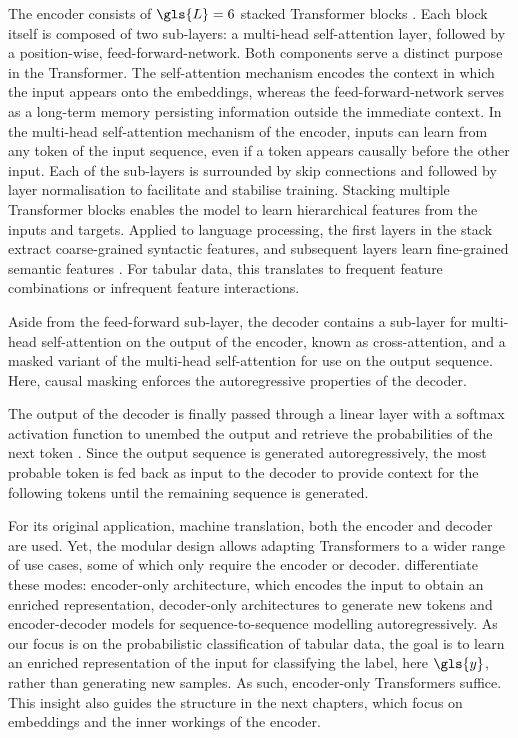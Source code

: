 The encoder consists of $\gls{L}=6$ stacked Transformer blocks \autocite[][6]{vaswaniAttentionAllYou2017}. Each block itself is composed of two sub-layers: a multi-head self-attention layer, followed by a position-wise, \gls{feed-forward-network}. Both components serve a distinct purpose in the Transformer. The self-attention mechanism encodes the context in which the input appears onto the \glspl{embedding}, whereas the \gls{feed-forward-network} serves as a long-term memory persisting information outside the immediate context. In the multi-head self-attention mechanism of the encoder, inputs can learn from any \gls{token} of the input sequence, even if a \gls{token} appears causally before the other input. Each of the sub-layers is surrounded by skip connections \autocite[][2]{heDeepResidualLearning2015} and followed by layer normalisation \autocite[][4]{baLayerNormalization2016} to facilitate and stabilise training. Stacking multiple Transformer blocks enables the model to learn hierarchical features from the inputs and targets. Applied to language processing, the first layers in the stack extract coarse-grained syntactic features, and subsequent layers learn fine-grained semantic features \autocites[][3651]{jawaharWhatDoesBERT2019}[][4596]{tenneyBERTRediscoversClassical2019}. For tabular data, this translates to frequent feature combinations or infrequent feature interactions.

Aside from the feed-forward sub-layer, the decoder contains a sub-layer for multi-head self-attention on the output of the encoder, known as cross-attention, and a masked variant of the multi-head self-attention for use on the output sequence. Here, causal masking enforces the autoregressive properties of the decoder.

The output of the decoder is finally passed through a linear layer with a softmax activation function to unembed the output and retrieve the probabilities of the next \gls{token} \autocite[][5]{vaswaniAttentionAllYou2017}. Since the output sequence is generated autoregressively, the most probable \gls{token} is fed back as input to the decoder to provide context for the following \glspl{token} until the remaining sequence is generated.

For its original application, machine translation, both the encoder and decoder are used. Yet, the modular design allows adapting Transformers to a wider range of use cases, some of which only require the encoder or decoder. \textcite[][16--17]{raffelExploringLimitsTransfer2020} differentiate these modes: encoder-only architecture, which encodes the input to obtain an enriched representation, decoder-only architectures to generate new \glspl{token} and encoder-decoder models for sequence-to-sequence modelling autoregressively. As our focus is on the probabilistic classification of tabular data, the goal is to learn an enriched representation of the input for classifying the label, here $\gls{y}$, rather than generating new samples. As such, encoder-only Transformers suffice. This insight also guides the structure in the next chapters, which focus on \glspl{embedding} and the inner workings of the encoder.

